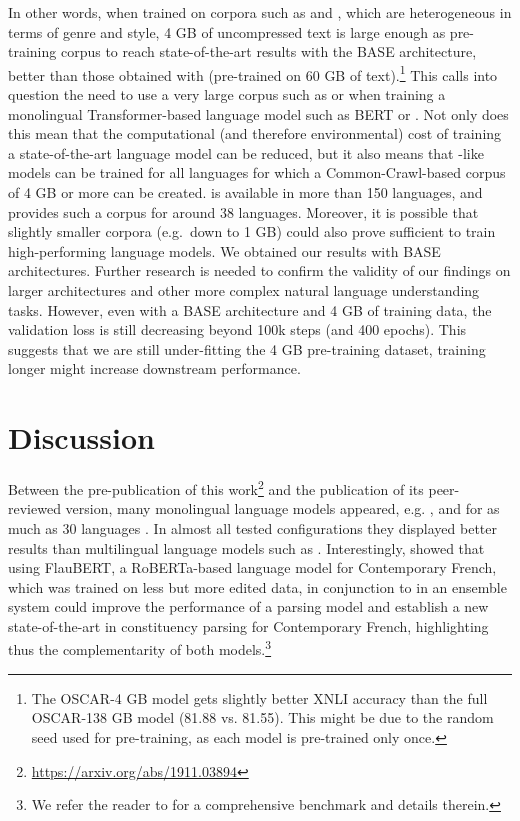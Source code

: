 In other words, when trained on corpora such as \oscar and \ccnet, which are heterogeneous in terms of genre and style, 4 GB of uncompressed text is large enough as pre-training corpus to reach state-of-the-art results with the BASE architecture, better than those obtained with \mbert (pre-trained on 60 GB of text).\footnote{The OSCAR-4 GB model gets slightly better XNLI accuracy than the full OSCAR-138 GB model (81.88 vs. 81.55). This might be due to the random seed used for pre-training, as each model is pre-trained only once.} This calls into question the need to use a very large corpus such as \oscar or \ccnet when training a monolingual Transformer-based language model such as BERT or \roberta. Not only does this mean that the computational (and therefore environmental) cost of training a state-of-the-art language model can be reduced, but it also means that \camembert-like models can be trained for all languages for which a Common-Crawl-based corpus of 4 GB or more can be created. \oscar is available in more than 150 languages, and provides such a corpus for around 38 languages. Moreover, it is possible that slightly smaller corpora (e.g.~down to 1 GB) could also prove sufficient to train high-performing language models. We obtained our results with BASE architectures. Further research is needed to confirm the validity of our findings on larger architectures and other more complex natural language understanding tasks. However, even with a BASE architecture and 4 GB of training data, the validation loss is still decreasing beyond 100k steps (and 400 epochs). This suggests that we are still under-fitting the 4 GB pre-training dataset, training longer might increase downstream performance.

\section{Discussion}

Between the pre-publication of this work\footnote{\url{https://arxiv.org/abs/1911.03894}} and the publication of its peer-reviewed version\citep{martin-etal-2020-camembert}, many monolingual language models appeared, e.g. \citep{le-etal-2020-flaubert-unsupervised,virtanen-etal-2019-multilingual,delobelle-etal-2020-robbert}, and for as much as 30 languages \citep{nozza-etal-2020-what}. In almost all tested configurations they displayed better results than multilingual language models such as \mbert \citep{pires-etal-2019-multilingual}. Interestingly, \citet{le-etal-2020-flaubert-unsupervised} showed that using FlauBERT, a RoBERTa-based language model for Contemporary French, which was trained on less but more edited data, in conjunction to \camembert in an ensemble system could improve the performance of a parsing model and establish a new state-of-the-art in constituency parsing for Contemporary French, highlighting thus the complementarity of both models.\footnote{We refer the reader to \citep{le-etal-2020-flaubert-unsupervised} for a comprehensive benchmark and details therein.}

